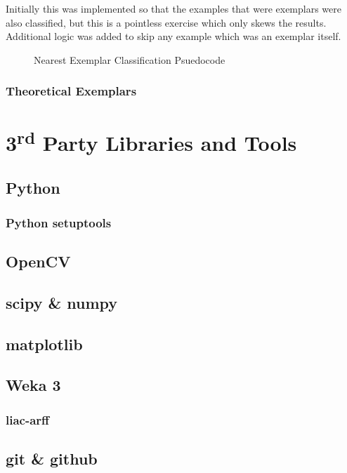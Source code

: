 Initially this was implemented so that the examples that were exemplars were also classified, but
this is a pointless exercise which only skews the results. Additional logic was added to skip any
example which was an exemplar itself.

\begin{figure}[h]
\begin{algorithmic}
\end{algorithmic}
\caption{Nearest Exemplar Classification Psuedocode}\label{fig:nec-psuedo}
\end{figure}

\subsubsection{Theoretical Exemplars}


\section{3\textsuperscript{rd} Party Libraries and Tools}

\subsection{Python}
\subsubsection{Python setuptools}

\subsection{OpenCV}

\subsection{scipy \& numpy}

\subsection{matplotlib}

\subsection{Weka 3}
\subsubsection{liac-arff}

\subsection{git \& github}


